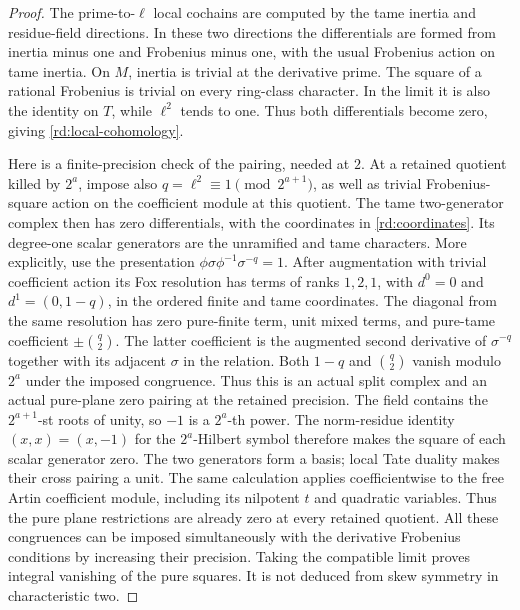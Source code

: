 \begin{proof}
The prime-to-\(\ell\) local cochains are computed by the tame inertia and
residue-field directions.  In these two directions the differentials
are formed from inertia minus one and Frobenius minus one, with the
usual Frobenius action on tame inertia.  On \(M\), inertia is trivial at
the derivative prime.  The square of a rational Frobenius is trivial
on every ring-class character.  In the limit it is also the identity on
\(T\), while \(\ell^2\) tends to one.  Thus both differentials become zero,
giving \eqref{rd:local-cohomology}.

Here is a finite-precision check of the pairing, needed at \(2\).
At a retained quotient killed by \(2^a\), impose also
\(q=\ell^2\equiv1\pmod{2^{a+1}}\), as well as trivial
Frobenius-square action on the coefficient module at this quotient.
The tame two-generator complex then has zero differentials,
with the coordinates in \eqref{rd:coordinates}.  Its degree-one
scalar generators are the unramified and tame characters.
More explicitly, use the presentation
\(\phi\sigma\phi^{-1}\sigma^{-q}=1\).
After augmentation with trivial coefficient action its Fox
resolution has terms of ranks \(1,2,1\), with
\(d^0=0\) and \(d^1=(0,1-q)\), in the ordered finite and
tame coordinates.  The diagonal from the same resolution
has zero pure-finite term, unit mixed terms, and pure-tame
coefficient \(\pm\binom q2\).  The latter coefficient is
the augmented second derivative of \(\sigma^{-q}\)
together with its adjacent \(\sigma\) in the relation.
Both \(1-q\) and \(\binom q2\) vanish modulo \(2^a\)
under the imposed congruence.  Thus this is an actual
split complex and an actual pure-plane zero pairing
at the retained precision.
The field contains the \(2^{a+1}\)-st roots of unity, so
\(-1\) is a \(2^a\)-th power.  The norm-residue identity
\((x,x)=(x,-1)\) for the \(2^a\)-Hilbert symbol therefore
makes the square of each scalar generator zero.
The two generators form a basis; local Tate duality makes
their cross pairing a unit.  The same calculation applies
coefficientwise to the free Artin coefficient module, including
its nilpotent \(t\) and quadratic variables.  Thus the pure
plane restrictions are already zero at every retained quotient.
All these congruences can be imposed simultaneously with the
derivative Frobenius conditions by increasing their precision.
Taking the compatible limit proves integral vanishing of the
pure squares.  It is not deduced from skew symmetry in
characteristic two.


\end{proof}
